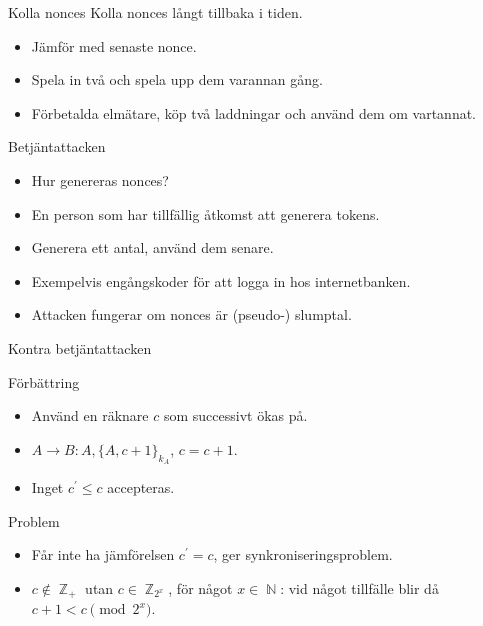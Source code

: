 \documentclass{beamer}
\theoremstyle{definition}
\theoremstyle{remark}
\DeclareMathOperator{\N}{\mathbb{N}}
\DeclareMathOperator{\Z}{\mathbb{Z}}
\newcommand{\encrypt}[2]{\{#1\}_{#2}}
\begin{document}
\begin{frame}{Kolla nonces}
  Kolla nonces långt tillbaka i tiden.
  \begin{itemize}
    \item Jämför med senaste nonce.
    \item Spela in två och spela upp dem varannan gång.
    \item Förbetalda elmätare, köp två laddningar och använd dem om vartannat.
  \end{itemize}
\end{frame}

\begin{frame}{Betjäntattacken}
  \begin{itemize}
    \item Hur genereras nonces?
    \item En person som har tillfällig åtkomst att generera tokens.
    \item Generera ett antal, använd dem senare.
    \item Exempelvis engångskoder för att logga in hos internetbanken.
    \item Attacken fungerar om nonces är (pseudo-) slumptal.
  \end{itemize}
\end{frame}

\begin{frame}{Kontra betjäntattacken}
  \begin{block}{Förbättring}
    \begin{itemize}
      \item Använd en räknare \(c\) som successivt ökas på.
      \item \(A\to B\colon A, \encrypt{A, c+1}{k_A}\), \(c = c+1\).
      \item Inget \(c^\prime \leq c\) accepteras.
    \end{itemize}
  \end{block}
  \begin{block}{Problem}
    \begin{itemize}
      \item Får inte ha jämförelsen \(c^\prime = c\), ger 
        synkroniseringsproblem.
      \item \(c\notin \Z_+\) utan \(c\in \Z_{2^x}\), för något \(x\in \N\): vid 
        något tillfälle blir då \(c+1 < c \pmod{2^x}\).
    \end{itemize}
  \end{block}
\end{frame}
\end{document}
